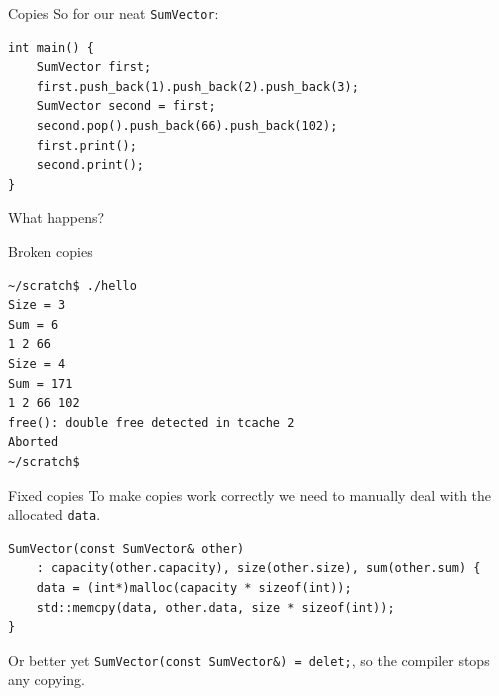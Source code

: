 \documentclass[11pt, aspectratio=169, table]{beamer}
\begin{document}
\begin{frame}[fragile]{Copies}
So for our neat \texttt{SumVector}:

\begin{verbatim}
int main() {
    SumVector first;
    first.push_back(1).push_back(2).push_back(3);
    SumVector second = first;
    second.pop().push_back(66).push_back(102);
    first.print();
    second.print();
}
\end{verbatim}

What happens?
\end{frame}

\begin{frame}[fragile]{Broken copies}
\begin{verbatim}
~/scratch$ ./hello
Size = 3
Sum = 6
1 2 66
Size = 4
Sum = 171
1 2 66 102
free(): double free detected in tcache 2
Aborted
~/scratch$
\end{verbatim}
\end{frame}

\begin{frame}[fragile]{Fixed copies}
To make copies work correctly we need to manually deal with the allocated \texttt{data}.

\begin{verbatim}
SumVector(const SumVector& other)
    : capacity(other.capacity), size(other.size), sum(other.sum) {
    data = (int*)malloc(capacity * sizeof(int));
    std::memcpy(data, other.data, size * sizeof(int));
}
\end{verbatim}

Or better yet \texttt{SumVector(const SumVector&) = delet;}, so the compiler stops any copying.
\end{frame}

%
\end{document}
